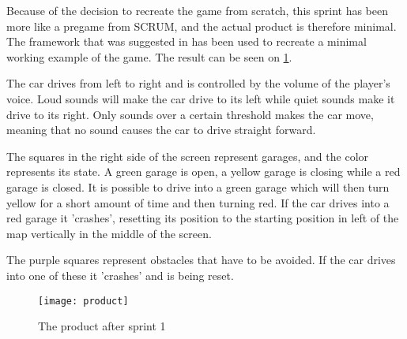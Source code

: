 Because of the decision to recreate the game from scratch, this sprint has been more like a pregame from SCRUM, and the actual product is therefore minimal.
The framework that was suggested in  has been used to recreate a minimal working example of the game.
The result can be seen on \ref{product-sprint1}.

The car drives from left to right and is controlled by the volume of the player's voice. 
Loud sounds will make the car drive to its left while quiet sounds make it drive to its right.
Only sounds over a certain threshold makes the car move, meaning that no sound causes the car to drive straight forward.

The squares in the right side of the screen represent garages, and the color represents its state. 
A green garage is open, a yellow garage is closing while a red garage is closed.
It is possible to drive into a green garage which will then turn yellow for a short amount of time and then turning red.
If the car drives into a red garage it 'crashes', resetting its position to the starting position in left of the map vertically in the middle of the screen.

The purple squares represent obstacles that have to be avoided. 
If the car drives into one of these it 'crashes' and is being reset.


\begin{figure}
\texttt{[image: product]}
\caption{The product after sprint 1}
\label{product-sprint1}
\end{figure}